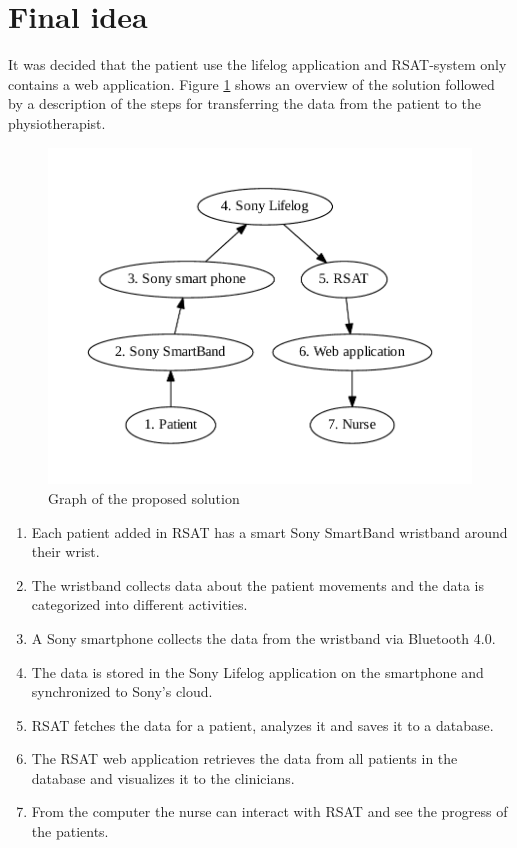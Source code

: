 \documentclass{cslthse-msc}
\begin{document}
\section{Final idea}
\label{sec:proposed-solution}
It was decided that the patient use the lifelog application and RSAT-system only contains a web application. 
Figure \ref{fig:pro} shows an overview of the solution followed by a description of the steps for transferring the data from the patient to the physiotherapist.



\begin{figure}[!hbt]
\centering
\includegraphics[scale=0.8]{proposed.pdf} 
\caption{Graph of the proposed solution}\label{fig:pro}
\end{figure}


\begin{enumerate}
    \item Each patient added in RSAT has a smart Sony SmartBand wristband around their wrist.
    \item The wristband collects data about the patient movements and the data is categorized into different activities.
    \item A Sony smartphone collects the data from the wristband via Bluetooth 4.0. 
    \item The data is stored in the Sony Lifelog application on the smartphone and synchronized to Sony's cloud.
    \item RSAT fetches the data for a patient, analyzes it and saves it to a database.
\item The RSAT web application retrieves the data from all patients in the database and visualizes it to the clinicians.
\item From the computer the nurse can interact with RSAT and see the progress of the patients. 
\end{enumerate}
\end{document}

